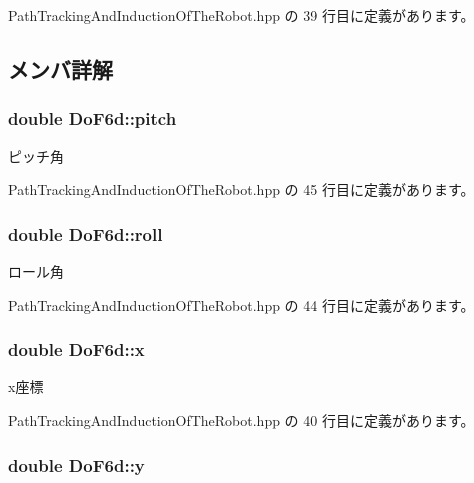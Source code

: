  Path\-Tracking\-And\-Induction\-Of\-The\-Robot.\-hpp の 39 行目に定義があります。



\subsection{メンバ詳解}
\subsubsection[{pitch}]{\setlength{\rightskip}{0pt plus 5cm}double Do\-F6d\-::pitch}\label{struct_do_f6d_a704ba95616e9709286fd32af023cf67f}


ピッチ角 



 Path\-Tracking\-And\-Induction\-Of\-The\-Robot.\-hpp の 45 行目に定義があります。

\subsubsection[{roll}]{\setlength{\rightskip}{0pt plus 5cm}double Do\-F6d\-::roll}\label{struct_do_f6d_af56535f5438f04febd58fe933238a081}


ロール角 



 Path\-Tracking\-And\-Induction\-Of\-The\-Robot.\-hpp の 44 行目に定義があります。

\subsubsection[{x}]{\setlength{\rightskip}{0pt plus 5cm}double Do\-F6d\-::x}\label{struct_do_f6d_a3c8c5d79d754552dee32563723755365}


x座標 



 Path\-Tracking\-And\-Induction\-Of\-The\-Robot.\-hpp の 40 行目に定義があります。

\subsubsection[{y}]{\setlength{\rightskip}{0pt plus 5cm}double Do\-F6d\-::y}\label{struct_do_f6d_ab5f2aa29a96c8b029ebdd14c202d8528}


